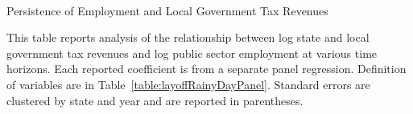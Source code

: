 
\begin{table}[!ht]
\begin{center}
\begin{threeparttable}


\caption{\\ Persistence of Employment and Local Government Tax Revenues }
\label{table:layoffPersistence}

\centering 

\begin{small}

	

\end{small}

\begin{footnotesize}
\begin{tablenotes}
\item This table reports analysis of the relationship between log state and local government tax revenues and log public sector employment at various time horizons. Each reported coefficient is from a separate panel regression. Definition of  variables are in Table~\ref{table:layoffRainyDayPanel}. Standard errors are clustered by state and year and are reported in parentheses.
\end{tablenotes}
\end{footnotesize}

\end{threeparttable}
\end{center}

\thispagestyle{empty}

\end{table}

